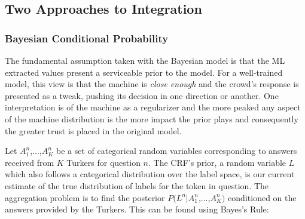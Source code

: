 \subsection{Two Approaches to Integration}



\subsubsection{Bayesian Conditional Probability}

The fundamental assumption taken with the Bayesian model is that the ML extracted values present a serviceable prior to the model.  For a well-trained model, this view is that the machine is \textit{close enough} and the crowd's response is presented as a tweak, pushing its decision in one direction or another.  One interpretation is of the machine as a regularizer and the more peaked any aspect of the machine distribution is the more impact the prior plays and consequently the greater trust is placed in the original model.

Let $A^{n}_{1}$,...,$A^{n}_{K}$ be a set of categorical random variables corresponding to answers received from $K$ Turkers for question $n$.  The CRF's prior, a random variable $L$ which also follows a categorical distribution over the label space, is our current estimate of the true distribution of labels for the token in question.  The aggregation problem is to find the posterior $P(L^{n}|A^{n}_{1}$,...,$A^{n}_{K})$ conditioned on the answers provided by the Turkers.  This can be found using Bayes's Rule:     

